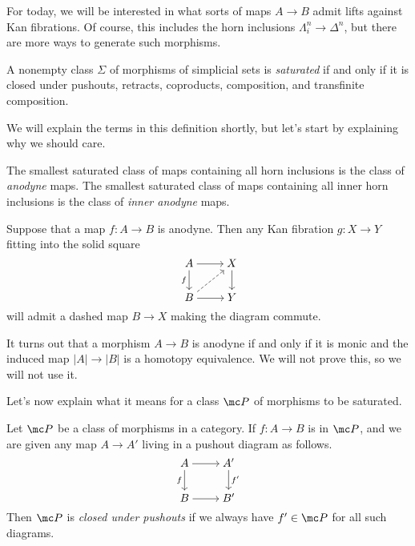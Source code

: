 \documentclass[../notes.tex]{subfiles}
\begin{document}
For today, we will be interested in what sorts of maps $A\to B$ admit lifts against Kan fibrations. Of course, this includes the horn inclusions $\Lambda^n_i\to\Delta^n$, but there are more ways to generate such morphisms.
\begin{definition}[saturated]
	A nonempty class $\Sigma$ of morphisms of simplicial sets is \textit{saturated} if and only if it is closed under pushouts, retracts, coproducts, composition, and transfinite composition.
\end{definition}
We will explain the terms in this definition shortly, but let's start by explaining why we should care.
\begin{definition}[anodyne]
	The smallest saturated class of maps containing all horn inclusions is the class of \textit{anodyne} maps. The smallest saturated class of maps containing all inner horn inclusions is the class of \textit{inner anodyne} maps.
\end{definition}
\begin{proposition}
	Suppose that a map $f\colon A\to B$ is anodyne. Then any Kan fibration $g\colon X\to Y$ fitting into the solid square
	\[\begin{tikzcd}[cramped]
		A & X \\
		B & Y
		\arrow[from=1-1, to=1-2]
		\arrow["f"', from=1-1, to=2-1]
		\arrow[from=1-2, to=2-2]
		\arrow[dashed, from=2-1, to=1-2]
		\arrow[from=2-1, to=2-2]
	\end{tikzcd}\]
	will admit a dashed map $B\to X$ making the diagram commute.
\end{proposition}
\begin{remark}
	It turns out that a morphism $A\to B$ is anodyne if and only if it is monic and the induced map $\left|A\right|\to\left|B\right|$ is a homotopy equivalence. We will not prove this, so we will not use it.
\end{remark}
Let's now explain what it means for a class $\mc P$ of morphisms to be saturated.
\begin{definition}
	Let $\mc P$ be a class of morphisms in a category. If $f\colon A\to B$ is in $\mc P$, and we are given any map $A\to A'$ living in a pushout diagram as follows.
	\[\begin{tikzcd}[cramped]
		A & {A'} \\
		B & {B'}
		\arrow[from=1-1, to=1-2]
		\arrow["f"', from=1-1, to=2-1]
		\arrow["{f'}", from=1-2, to=2-2]
		\arrow[from=2-1, to=2-2]
	\end{tikzcd}\]
	Then $\mc P$ is \textit{closed under pushouts} if we always have $f'\in\mc P$ for all such diagrams.
\end{definition}
\end{document}
